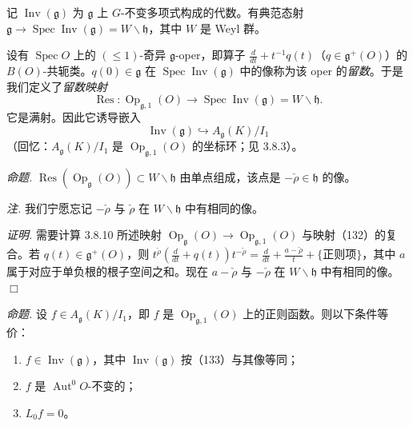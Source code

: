 
 记 $\operatorname{Inv}(\mathfrak{g})$ 为 $\mathfrak{g}$ 上 $G$-不变多项式构成的代数。有典范态射 $\mathfrak{g}\to\operatorname{Spec}\operatorname{Inv}(\mathfrak{g})=W\backslash\mathfrak{h}$，其中 $W$ 是 Weyl 群。

设有 $\operatorname{Spec}O$ 上的 $(\le 1)$-奇异 $\mathfrak{g}$-oper，即算子 $\frac{d}{dt}+t^{-1}q(t)$（$q\in\mathfrak{g}^{+}(O)$）的 $B(O)$-共轭类。$q(0)\in\mathfrak{g}$ 在 $\operatorname{Spec}\operatorname{Inv}(\mathfrak{g})$ 中的像称为该 oper 的\emph{留数}。于是我们定义了\emph{留数映射}
\begin{equation}\tag{132}
  \operatorname{Res}:\operatorname{Op}_{\mathfrak{g},1}(O)\to\operatorname{Spec}\operatorname{Inv}(\mathfrak{g})=W\backslash\mathfrak{h}.
\end{equation}
它是满射。因此它诱导嵌入
\begin{equation}\tag{133}
  \operatorname{Inv}(\mathfrak{g})\hookrightarrow A_{\mathfrak{g}}(K)/I_{1}
\end{equation}
（回忆：$A_{\mathfrak{g}}(K)/I_{1}$ 是 $\operatorname{Op}_{\mathfrak{g},1}(O)$ 的坐标环；见 3.8.3）。

 \emph{命题.} $\operatorname{Res}(\operatorname{Op}_{\mathfrak{g}}(O))\subset W\backslash\mathfrak{h}$ 由单点组成，该点是 $-\check\rho\in\mathfrak{h}$ 的像。

\emph{注.} 我们宁愿忘记 $-\check\rho$ 与 $\check\rho$ 在 $W\backslash\mathfrak{h}$ 中有相同的像。

\emph{证明.} 需要计算 3.8.10 所述映射 $\operatorname{Op}_{\mathfrak{g}}(O)\to\operatorname{Op}_{\mathfrak{g},1}(O)$ 与映射（132）的复合。若 $q(t)\in\mathfrak{g}^{+}(O)$，则 $t^{\check\rho}(\frac{d}{dt}+q(t))t^{-\check\rho}=\frac{d}{dt}+\frac{a-\check\rho}{t}+\{\text{正则项}\}$，其中 $a$ 属于对应于单负根的根子空间之和。现在 $a-\check\rho$ 与 $-\check\rho$ 在 $W\backslash\mathfrak{h}$ 中有相同的像。\hfill$\Box$

 \emph{命题.} 设 $f\in A_{\mathfrak{g}}(K)/I_{1}$，即 $f$ 是 $\operatorname{Op}_{\mathfrak{g},1}(O)$ 上的正则函数。则以下条件等价：
\begin{enumerate}[label=(\roman*),leftmargin=2.2em]
\item $f\in\operatorname{Inv}(\mathfrak{g})$，其中 $\operatorname{Inv}(\mathfrak{g})$ 按（133）与其像等同；
\item $f$ 是 $\operatorname{Aut}^{0}O$-不变的；
\item $L_{0}f=0$。
\end{enumerate}

